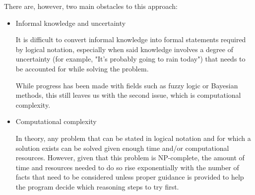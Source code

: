 \documentclass[masterthesis]{fer}
\begin{document}
There are, however, two main obstacles to this approach:

\begin{itemize}
\item{Informal knowledge and uncertainty}

It is difficult to convert informal knowledge into formal statements required by logical notation, especially when said knowledge involves a degree of uncertainty (for example, "It's probably going to rain today") that needs to be accounted for while solving the problem.

While progress has been made with fields such as fuzzy logic or Bayesian methods, this still leaves us with the second issue, which is computational complexity.

\item{Computational complexity}

In theory, any problem that can be stated in logical notation and for which a solution exists can be solved given enough time and/or computational resources.
However, given that this problem is NP-complete, the amount of time and resources needed to do so rise exponentially with the number of facts that need to be considered unless proper guidance is provided to help the program decide which reasoning steps to try first.
\end{itemize}
\end{document}
